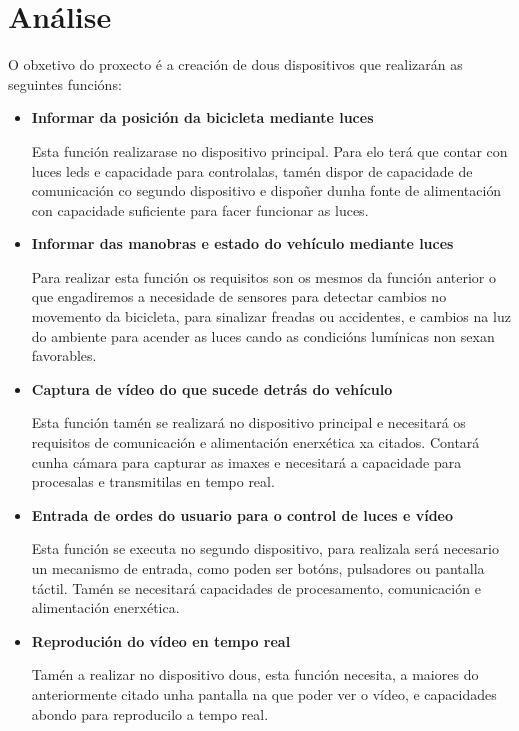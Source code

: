 \section{Análise}
O obxetivo do proxecto é a creación de dous dispositivos que realizarán as seguintes funcións:
\begin{itemize}
    \item\textbf{Informar da posición da bicicleta mediante luces}

Esta función realizarase no dispositivo principal. Para elo terá que contar con luces leds e capacidade para controlalas, tamén dispor de capacidade de comunicación co segundo dispositivo e dispoñer dunha fonte de alimentación con capacidade suficiente para facer funcionar as luces.\\

    \item\textbf{Informar das manobras e estado do vehículo mediante luces}

Para realizar esta función os requisitos son os mesmos da función anterior o que engadiremos a necesidade de sensores para detectar cambios no movemento da bicicleta, para sinalizar freadas ou accidentes, e cambios na luz do ambiente para acender as luces cando as condicións lumínicas non sexan favorables.\\

    \item\textbf{Captura de vídeo do que sucede detrás do vehículo}

Esta función tamén se realizará no dispositivo principal e necesitará os requisitos de comunicación e alimentación enerxética xa citados. Contará cunha cámara para capturar as imaxes e necesitará a capacidade para procesalas e transmitilas en tempo real.\\

    \item\textbf{Entrada de ordes do usuario para o control de luces e vídeo}

Esta función se executa no segundo dispositivo, para realizala será necesario un mecanismo de entrada, como poden ser botóns, pulsadores ou pantalla táctil. Tamén se necesitará capacidades de procesamento, comunicación e alimentación enerxética.\\

    \item\textbf{Reprodución do vídeo en tempo real}

Tamén a realizar no dispositivo dous, esta función necesita, a maiores do anteriormente citado unha pantalla na que poder ver o vídeo, e capacidades abondo para reproducilo a tempo real.
\end{itemize}

